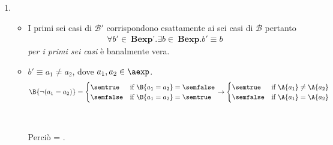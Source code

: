 {\begin{enumerate}[label=(\alph*)]
   =
  \caseFun{\semtrue}
          {( = \semtrue \mbox{ and }  = \semtrue)
           \mbox{ or }
           ( = \semfalse \mbox{ and }  = \semfalse)}
          {\semfalse}
          {( = \semtrue \mbox{ or }  = \semtrue)
           \mbox{ and }
           ( = \semfalse \mbox{ or }  = \semfalse)}
          \\ \\

\item
  \begin{itemize}
    \item I primi sei casi di $\mathcal{B'}$ corrispondono esattamente ai sei
casi di $\mathcal{B}$ pertanto
      \begin{align*}
        \forall b' \in \ \textbf{Bexp'}.\exists b \in 
        \ \textbf{Bexp}.b' \equiv b
      \end{align*}
      \textit{per i primi sei casi} è banalmente vera.

    \item $b' \equiv a_1 \neq a_2$, dove $a_1, a_2 \in \aexp$. \\ 
      \begin{align*}
        \B{\lnot (a_1 = a_2)} =
        \begin{cases}
          \semtrue &
          \mbox{if} \ \B{a_1 = a_2} = \semfalse \\
          \semfalse &
          \mbox{if} \ \B{a_1 = a_2} = \semtrue \\
        \end{cases}
        \rightarrow
        \begin{cases}
          \semtrue &
          \mbox{if} \ \A{a_1} \neq  \A{a_2} \\
          \semfalse &
          \mbox{if} \ \A{a_1} = \A{a_2} \\
        \end{cases}
      \end{align*} \\ \\
      Perciò  = . \\


\end{itemize}
\end{enumerate}}
